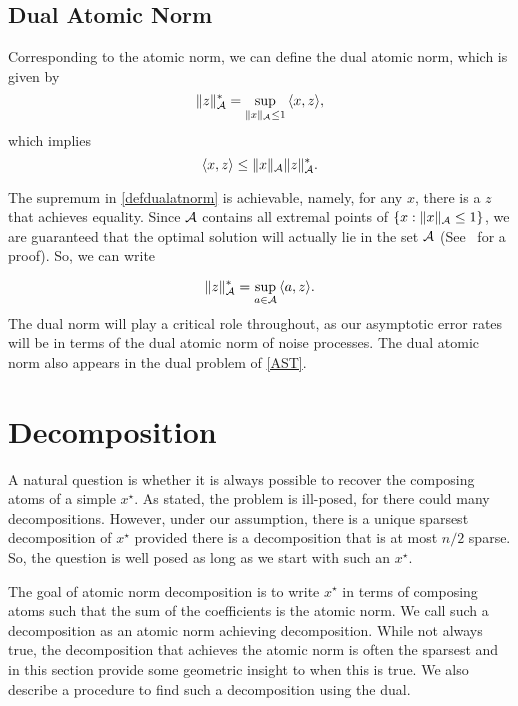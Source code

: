 \subsection{Dual Atomic Norm}

Corresponding to the atomic norm, we can define the dual atomic norm, which is
given by
\begin{equation}
  \label{defdualatnorm}
  \lVert z\rVert_{\mathcal{A}}^* = \sup_{\lVert x\rVert_{\mathcal{A}} \leq 1}{\langle x, z\rangle},
\end{equation}
which implies
\begin{equation}
  \label{holder}
  \langle x, z\rangle \leq \lVert x\rVert_{\mathcal{A}} \lVert z\rVert_{\mathcal{A}}^*.
\end{equation}

The supremum in \eqref{defdualatnorm} is achievable, namely, for any $x$, there
is a $z$ that achieves equality. Since $\mathcal{A}$ contains all extremal points of
$\{x: \|x\|_{\mathcal{A}} \leq 1\}$, we are guaranteed that the optimal solution will
actually lie in the set $\mathcal{A}$ (See~\cite{bonsall} for a proof). So, we can write

\begin{equation}
\lVert z\rVert_{\mathcal{A}}^* = \sup_{a \in \mathcal{A}}{\langle a, z\rangle}.\label{bonsall}
\end{equation}
The dual norm will play a critical role throughout, as our asymptotic error
rates will be in terms of the dual atomic norm of noise processes. The dual
atomic norm also appears in the dual problem of \eqref{AST}.

\section{Decomposition}
\label{sec:decomposition}

A natural question is whether it is always possible to recover the composing
atoms of a simple $x^\star$. As stated, the problem is ill-posed, for there
could many decompositions. However, under our assumption, there is a unique
sparsest decomposition of $x^\star$ provided there is a decomposition that is at
most $n/2$ sparse. So, the question is well posed as long as we start with such
an $x^\star.$

The goal of atomic norm decomposition is to write $x^\star$ in terms of
composing atoms such that the sum of the coefficients is the atomic norm. We
call such a decomposition as an atomic norm achieving decomposition. While not
always true, the decomposition that achieves the atomic norm is often the
sparsest and in this section provide some geometric insight to when this is
true. We also describe a procedure to find such a decomposition using the dual.

